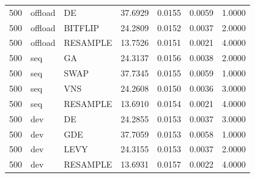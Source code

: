 \begin{tabular}{rllrrrr}
500 & offload & DE & 37.6929 & 0.0155 & 0.0059 & 1.0000 \\
500 & offload & BITFLIP & 24.2809 & 0.0152 & 0.0037 & 2.0000 \\
500 & offload & RESAMPLE & 13.7526 & 0.0151 & 0.0021 & 4.0000 \\
500 & seq & GA & 24.3137 & 0.0156 & 0.0038 & 2.0000 \\
500 & seq & SWAP & 37.7345 & 0.0155 & 0.0059 & 1.0000 \\
500 & seq & VNS & 24.2608 & 0.0150 & 0.0036 & 3.0000 \\
500 & seq & RESAMPLE & 13.6910 & 0.0154 & 0.0021 & 4.0000 \\
500 & dev & DE & 24.2855 & 0.0153 & 0.0037 & 3.0000 \\
500 & dev & GDE & 37.7059 & 0.0153 & 0.0058 & 1.0000 \\
500 & dev & LEVY & 24.3155 & 0.0153 & 0.0037 & 2.0000 \\
500 & dev & RESAMPLE & 13.6931 & 0.0157 & 0.0022 & 4.0000 \\
\bottomrule
\end{tabular}
